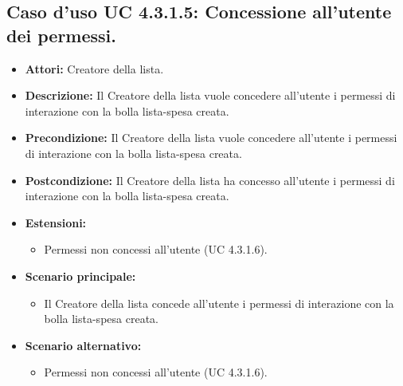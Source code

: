 \subsection{Caso d'uso UC 4.3.1.5: Concessione all'utente dei permessi.}
\label{Caso d'uso UC 4.3.1.5: Concessione all'utente dei permessi.}

\FloatBarrier
\begin{itemize}
\item \textbf{Attori:} Creatore della lista.
\item \textbf{Descrizione:} Il Creatore della lista vuole concedere all'utente i permessi di interazione con la bolla lista-spesa creata.
\item \textbf{Precondizione:} Il Creatore della lista vuole concedere all'utente i permessi di interazione con la bolla lista-spesa creata. 
\item \textbf{Postcondizione:} Il Creatore della lista ha concesso all'utente i permessi di interazione con la bolla lista-spesa creata.
\item \textbf{Estensioni:}
	\begin{itemize}
	\item{Permessi non concessi all'utente (UC 4.3.1.6).}
	\end{itemize}
\item \textbf{Scenario principale:}
\begin{itemize}
\item Il Creatore della lista concede all'utente i permessi di interazione con la bolla lista-spesa creata.
\end{itemize}
\item \textbf{Scenario alternativo:}
\begin{itemize}
\item Permessi non concessi all'utente (UC 4.3.1.6).
\end{itemize}
\end{itemize}